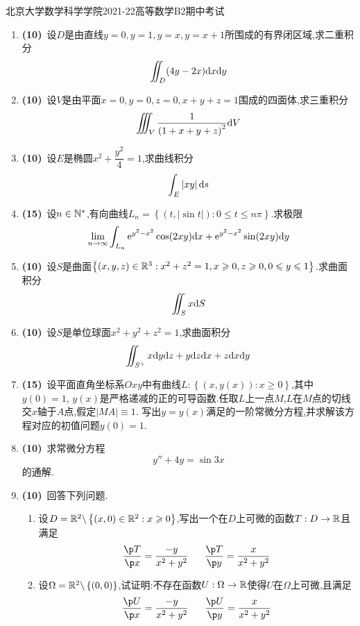 \documentclass{ctexart}
\begin{document}
\pagestyle{empty}
\begin{center}\Large
    北京大学数学科学学院2021-22高等数学B2期中考试
\end{center}
\begin{enumerate}[leftmargin=*,label=\textbf{\arabic*.}]
    \item \textbf{(10)}\ 设$D$是由直线$y=0,y=1,y=x,y=x+1$所围成的有界闭区域,求二重积分
    \[\iint_D(4y-2x)\mathrm{d} x\mathrm{d} y\]

    \item \textbf{(10)}\ 设$V$是由平面$x=0,y=0,z=0,x+y+z=1$围成的四面体,求三重积分
    \[\iiint_V\dfrac{1}{\left(1+x+y+z\right)^2}\mathrm{d} V\]

    \item \textbf{(10)}\ 设$E$是椭圆$x^2+\dfrac{y^2}{4}=1$,求曲线积分
    \[\int_E\left|xy\right|\mathrm{d} s\]

    \item \textbf{(15)}\ 设$n\in\mathbb{N}^*$,有向曲线$L_n=\left\{\left(t,\left|\sin t\right|\right):0\leqslant t\leqslant n\pi\right\}$.求极限
    \[\lim_{n\to\infty}\int_{L_n}\mathrm{e}^{y^2-x^2}\cos(2xy)\mathrm{d} x+\mathrm{e}^{y^2-x^2}\sin(2xy)\mathrm{d} y\]

    \item \textbf{(10)}\ 设$S$是曲面$\left\{(x,y,z)\in\mathbb{R}^3:x^2+z^2=1,x\geqslant 0,z\geqslant 0,0\leqslant y\leqslant 1\right\}$.求曲面积分
    \[\iint_Sx\mathrm{d} S\]

    \item \textbf{(10)}\ 设$S$是单位球面$x^2+y^2+z^2=1$,求曲面积分
    \[\iint_{S^+}x\mathrm{d} y\mathrm{d} z+y\mathrm{d} z\mathrm{d} x+z\mathrm{d} x\mathrm{d} y\]

    \item \textbf{(15)}\ 设平面直角坐标系$Oxy$中有曲线$L:\left\{(x,y(x)):x\geqslant0\right\}$,其中$y(0)=1$,%
    $y(x)$是严格递减的正的可导函数.任取$L$上一点$M$,$L$在$M$点的切线交$x$轴于$A$点,假定$\left|MA\right|\equiv1$.%
    写出$y=y(x)$满足的一阶常微分方程,并求解该方程对应的初值问题$y(0)=1$.

    \item \textbf{(10)}\ 求常微分方程
    \[y''+4y=\sin3x\]
    的通解.

    \item \textbf{(10)}\ 回答下列问题.
    \begin{enumerate}[label=\tbf{(\arabic*)}]
        \item 设$D=\mathbb{R}^2\backslash\left\{(x,0)\in\mathbb{R}^2:x\geqslant 0\right\}$,写出一个在$D$上可微的函数$T:D\to\mathbb{R}$且满足
            \[\dfrac{\p T}{\p x}=\dfrac{-y}{x^2+y^2}\ \ \ \ \ \dfrac{\p T}{\p y}=\dfrac{x}{x^2+y^2}\]
        \item 设$\Omega=\mathbb{R}^2\backslash\left\{(0,0)\right\}$,试证明:不存在函数$U:\Omega\to\mathbb{R}$使得$U$在$\Omega$上可微,且满足
            \[\dfrac{\p U}{\p x}=\dfrac{-y}{x^2+y^2}\ \ \ \ \ \dfrac{\p U}{\p y}=\dfrac{x}{x^2+y^2}\]
    \end{enumerate}

\end{enumerate}
\end{document}
